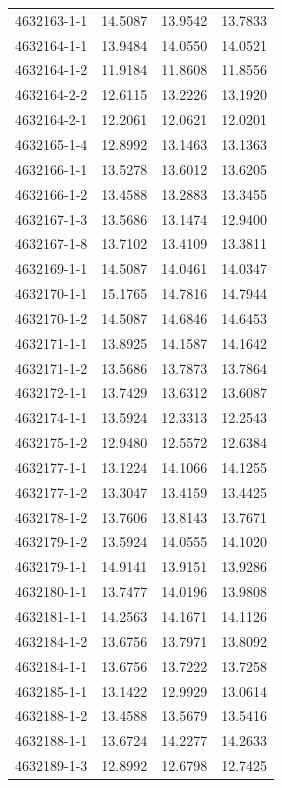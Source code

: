\begin{longtable}{lrrr}
4632163-1-1 & 14.5087 & 13.9542 & 13.7833 \\
4632164-1-1 & 13.9484 & 14.0550 & 14.0521 \\
4632164-1-2 & 11.9184 & 11.8608 & 11.8556 \\
4632164-2-2 & 12.6115 & 13.2226 & 13.1920 \\
4632164-2-1 & 12.2061 & 12.0621 & 12.0201 \\
4632165-1-4 & 12.8992 & 13.1463 & 13.1363 \\
4632166-1-1 & 13.5278 & 13.6012 & 13.6205 \\
4632166-1-2 & 13.4588 & 13.2883 & 13.3455 \\
4632167-1-3 & 13.5686 & 13.1474 & 12.9400 \\
4632167-1-8 & 13.7102 & 13.4109 & 13.3811 \\
4632169-1-1 & 14.5087 & 14.0461 & 14.0347 \\
4632170-1-1 & 15.1765 & 14.7816 & 14.7944 \\
4632170-1-2 & 14.5087 & 14.6846 & 14.6453 \\
4632171-1-1 & 13.8925 & 14.1587 & 14.1642 \\
4632171-1-2 & 13.5686 & 13.7873 & 13.7864 \\
4632172-1-1 & 13.7429 & 13.6312 & 13.6087 \\
4632174-1-1 & 13.5924 & 12.3313 & 12.2543 \\
4632175-1-2 & 12.9480 & 12.5572 & 12.6384 \\
4632177-1-1 & 13.1224 & 14.1066 & 14.1255 \\
4632177-1-2 & 13.3047 & 13.4159 & 13.4425 \\
4632178-1-2 & 13.7606 & 13.8143 & 13.7671 \\
4632179-1-2 & 13.5924 & 14.0555 & 14.1020 \\
4632179-1-1 & 14.9141 & 13.9151 & 13.9286 \\
4632180-1-1 & 13.7477 & 14.0196 & 13.9808 \\
4632181-1-1 & 14.2563 & 14.1671 & 14.1126 \\
4632184-1-2 & 13.6756 & 13.7971 & 13.8092 \\
4632184-1-1 & 13.6756 & 13.7222 & 13.7258 \\
4632185-1-1 & 13.1422 & 12.9929 & 13.0614 \\
4632188-1-2 & 13.4588 & 13.5679 & 13.5416 \\
4632188-1-1 & 13.6724 & 14.2277 & 14.2633 \\
4632189-1-3 & 12.8992 & 12.6798 & 12.7425 \\

\end{longtable}
